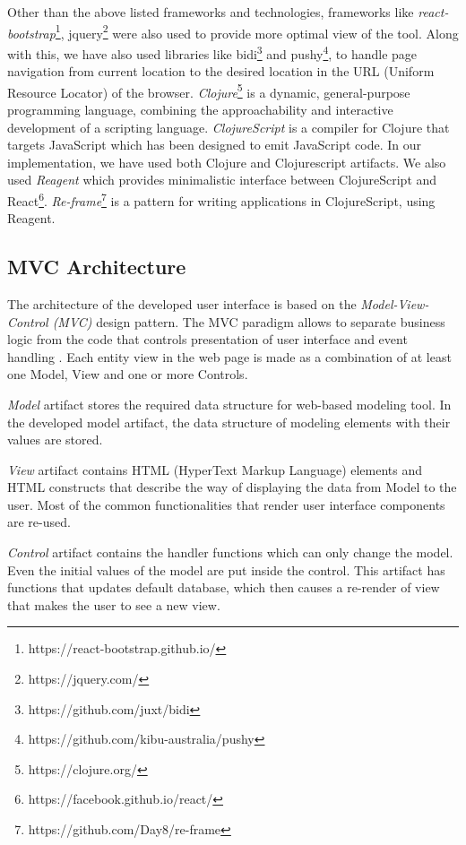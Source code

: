 Other than the above listed frameworks and technologies, frameworks like \textit{react-bootstrap}\footnote{https://react-bootstrap.github.io/}, jquery\footnote{https://jquery.com/} were also used to provide more optimal view of the tool. Along with this, we have also used libraries like bidi\footnote{https://github.com/juxt/bidi} and pushy\footnote{https://github.com/kibu-australia/pushy}, to handle page navigation from current location to the desired location in the URL (Uniform Resource Locator) of the browser. \textit{Clojure}\footnote{https://clojure.org/} is a dynamic, general-purpose programming language, combining the approachability and interactive development of a scripting language. \textit{ClojureScript} is a compiler for Clojure that targets JavaScript which has been designed to emit JavaScript code. In our implementation, we have used both Clojure and Clojurescript artifacts. We also used \textit{Reagent} which provides minimalistic interface between ClojureScript and React\footnote{https://facebook.github.io/react/}. \textit{Re-frame}\footnote{https://github.com/Day8/re-frame} is a pattern for writing applications in ClojureScript, using Reagent.

\subsection{MVC Architecture}
\label{subsec:mvcarch}
The architecture of the developed user interface is based on the \textit{Model-View-Control (MVC)} design pattern. The MVC paradigm allows to separate business logic from the code that controls presentation of user interface and event handling \cite{Oracle2016}. Each entity view in the web page is made as a combination of at least one Model, View and one or more Controls. 

\textit{Model} artifact stores the required data structure for web-based modeling tool. In the developed model artifact, the data structure of modeling elements with their values are stored. 

\textit{View} artifact contains HTML (HyperText Markup Language) elements and HTML constructs that describe the way of displaying the data from Model to the user. Most of the common functionalities that render user interface components are re-used. 

\textit{Control} artifact contains the handler functions which can only change the model. Even the initial values of the model are put inside the control. This artifact has functions that updates default database, which then causes a re-render of view that makes the user to see a new view.

